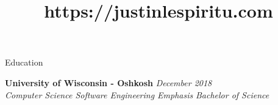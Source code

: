 \documentclass{resume} %
\title{https://justinlespiritu.com}
\begin{document}

\begin{rSection}{Education}

{\bf University of Wisconsin - Oshkosh} \hfill {\em December 2018} \\
{\em Computer Science \seperator Software Engineering Emphasis} \hfill {\em Bachelor of Science}

\end{rSection}

\end{document}
